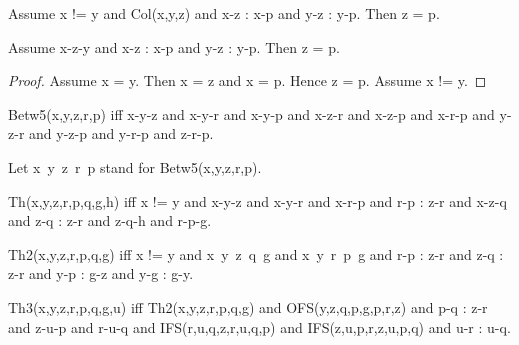 \documentclass{article}
\begin{document}
\begin{forthel}
    \begin{lemma}[L4_18]
      Assume x != y and Col(x,y,z) and x-z : x-p and y-z : y-p. Then z = p.
    \end{lemma}

    \begin{lemma}[L4_19]
      Assume x-z-y and x-z : x-p and y-z : y-p. Then z = p.
    \end{lemma}
    \begin{proof}
      Assume x = y. Then x = z and x = p. Hence z = p.
      Assume x != y.
    \end{proof}


    \begin{definition}[C5_1a]
      Betw5(x,y,z,r,p) iff x-y-z and x-y-r and x-y-p and x-z-r and x-z-p and
      x-r-p and y-z-r and y-z-p and y-r-p and z-r-p.
    \end{definition}

    Let x~y~z~r~p stand for Betw5(x,y,z,r,p).


    \begin{definition}[C5_1b]
      Th(x,y,z,r,p,q,g,h) iff x != y and x-y-z and x-y-r and x-r-p and r-p : z-r
      and x-z-q and z-q : z-r and z-q-h and r-p-g.
    \end{definition}

    \begin{definition}[C5_1c]
      Th2(x,y,z,r,p,q,g) iff x != y and x~y~z~q~g and x~y~r~p~g and r-p : z-r
      and z-q : z-r and y-p : g-z and y-g : g-y.
    \end{definition}

    \begin{definition}[C5_1d]
      Th3(x,y,z,r,p,q,g,u) iff Th2(x,y,z,r,p,q,g) and OFS(y,z,q,p,g,p,r,z) and
      p-q : z-r and z-u-p and r-u-q and IFS(r,u,q,z,r,u,q,p) and
      IFS(z,u,p,r,z,u,p,q) and u-r : u-q.
    \end{definition}


\end{forthel}
\end{document}
